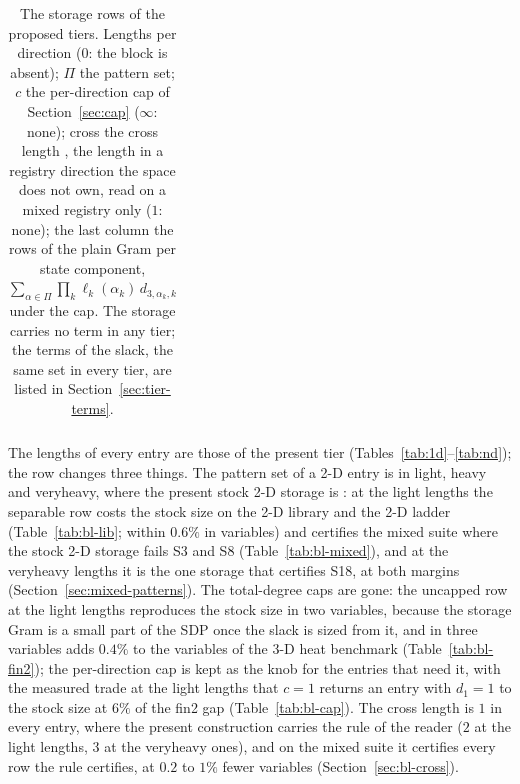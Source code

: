 \begin{table}[h]
\begin{tabular}{llrrrrrllrr}
\bottomrule
\end{tabular}
\caption{The storage rows of the proposed tiers. Lengths per direction ($0$: the block is absent); $\Pi$ the pattern set; $c$ the per-direction cap of Section~\ref{sec:cap} ($\infty$: none); cross the cross length , the length in a registry direction the space does not own, read on a mixed registry only ($1$: none); the last column the rows of the plain Gram per state component, $\sum_{\alpha\in\Pi}\prod_k\ell_k(\alpha_k)\,d_{3,\alpha_k,k}$ under the cap. The storage carries no term in any tier; the terms of the slack, the same set in every tier, are listed in Section~\ref{sec:tier-terms}.}\label{tab:tiers}
\end{table}

The lengths of every entry are those of the present tier (Tables~\ref{tab:1d}--\ref{tab:nd}); the row changes three things. The pattern set of a 2-D entry is  in light, heavy and veryheavy, where the present stock 2-D storage is : at the light lengths the separable row costs the stock size on the 2-D library and the 2-D ladder (Table~\ref{tab:bl-lib}; within $0.6\%$ in variables) and certifies the mixed suite where the stock 2-D storage fails S3 and S8 (Table~\ref{tab:bl-mixed}), and at the veryheavy lengths it is the one storage that certifies S18, at both margins (Section~\ref{sec:mixed-patterns}). The total-degree caps are gone: the uncapped row at the light lengths reproduces the stock size in two variables, because the storage Gram is a small part of the SDP once the slack is sized from it, and in three variables adds $0.4\%$ to the variables of the 3-D heat benchmark (Table~\ref{tab:bl-fin2}); the per-direction cap is kept as the knob for the entries that need it, with the measured trade at the light lengths that $c=1$ returns an  entry with $d_1=1$ to the stock size at $6\%$ of the fin2 gap (Table~\ref{tab:bl-cap}). The cross length is $1$ in every entry, where the present construction carries the rule of the reader ($2$ at the light lengths, $3$ at the veryheavy ones), and on the mixed suite it certifies every row the rule certifies, at $0.2$ to $1\%$ fewer variables (Section~\ref{sec:bl-cross}).

